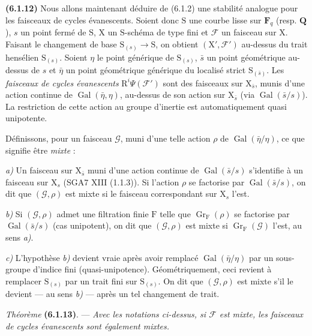 \documentclass[11pt,leqno]{article}
\begin{document}
\textbf{(6.1.12)} Nous allons maintenant déduire de (6.1.2) une
stabilité analogue pour les faisceaux de cycles évanescents.
Soient donc \(\mathrm{S}\) une courbe lisse sur \(\mathbf{F}_q\)
(resp. \(\mathbf{Q}\)), \(s\) un point fermé de \(\mathrm{S}\),
\(\mathrm{X}\) un \(\mathrm{S}\)-schéma de type fini et \(\mathscr{F}\)
un faisceau sur \(\mathrm{X}\). Faisant le changement de base
\(\mathrm{S}_{(s)}\to\mathrm{S}\), on obtient
\((\mathrm{X}',\mathscr{F}')\) au-dessus du trait hensélien
\(\mathrm{S}_{(s)}\). Soient \(\eta\) le point générique de
\(\mathrm{S}_{(s)}\), \(\bar{s}\) un point géométrique au-dessus de
\(s\) et \(\bar{\eta}\) un point géométrique générique du localisé
strict \(\mathrm{S}_{(\bar{s})}\). Les \textit{faisceaux de cycles
évanescents} \(\mathrm{R}^i\Psi(\mathscr{F}')\) sont des faisceaux
sur \(\mathrm{X}_{\bar{s}}\), munis d’une action continue de
\(\operatorname{Gal}(\bar{\eta},\eta)\), au-dessus de son action sur
\(\mathrm{X}_{\bar{s}}\) (via \(\operatorname{Gal}(\bar{s}/s)\)).
La restriction de cette action au groupe d’inertie est
automatiquement quasi unipotente.

Définissons, pour un faisceau \(\mathscr{G}\), muni d’une telle
action \(\rho\) de \(\operatorname{Gal}(\bar{\eta}/\eta)\), ce que
signifie être \textit{mixte} :

\textit{a)} Un faisceau sur \(\mathrm{X}_{\bar{s}}\) muni d’une action
continue de \(\operatorname{Gal}(\bar{s}/s)\) s’identifie à un
faisceau sur \(\mathrm{X}_s\) (SGA7 XIII (1.1.3)). Si l’action
\(\rho\) se factorise par \(\operatorname{Gal}(\bar{s}/s)\), on dit
que \((\mathscr{G},\rho)\) est mixte si le faisceau correspondant
sur \(\mathrm{X}_s\) l’est.

\textit{b)} Si \((\mathscr{G},\rho)\) admet une filtration finie
\(\mathrm{F}\) telle que \(\operatorname{Gr}_{\mathrm{F}}(\rho)\)
se factorise par \(\operatorname{Gal}(\bar{s}/s)\) (cas unipotent),
on dit que \((\mathscr{G},\rho)\) est mixte si
\(\operatorname{Gr}_{\mathrm{F}}(\mathscr{G})\) l’est, au sens
\textit{a)}.

\textit{c)} L’hypothèse \textit{b)} devient vraie après avoir remplacé
\(\operatorname{Gal}(\bar{\eta}/\eta)\) par un sous-groupe d’indice
fini (quasi-unipotence). Géométriquement, ceci revient à remplacer
\(\mathrm{S}_{(s)}\) par un trait fini sur \(\mathrm{S}_{(s)}\).
On dit que \((\mathscr{G},\rho)\) est mixte s’il le devient — au
sens \textit{b)} — après un tel changement de trait.

\textit{Théorème} \textbf{(6.1.13)}. — \textit{Avec les notations
ci-dessus, si \(\mathscr{F}\) est mixte, les faisceaux de cycles
évanescents sont également mixtes.}
\end{document}

